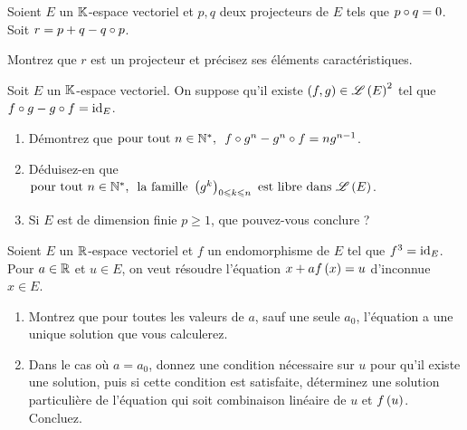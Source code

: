 \begin{corr}
\end{corr}

\begin{exoss}[Exercice 13]
Soient \(E\) un \(\mathbb{K}\)-espace vectoriel et \(p,q\) deux projecteurs de \(E\) tels que \(p\circ q=0\). Soit \(r=p+q-q\circ p\).

Montrez que \(r\) est un projecteur et précisez ses éléments caractéristiques.
\end{exoss}

\begin{corr}
\end{corr}

\begin{exoss}[Exercice 14]
Soit \(E\) un \(\mathbb{K}\)-espace vectoriel. On suppose qu'il existe \(\left(f,g\right)\in\mathscr{L}\left(E\right)^2\) tel que \(f\circ g-g\circ f=\mathrm{id}_{E}\).

\begin{enumerate}
    \item Démontrez que \(\quantifs{\tpt n\in\Ns}f\rond g^n-g^n\rond f=ng^{n-1}\). \\
    \item Déduisez-en que \(\quantifs{\tpt n\in\Ns}\text{la famille }\paren{g^k}_{0\leq k\leq n}\text{ est libre dans }\Lendo{E}\). \\
    \item Si \(E\) est de dimension finie \(p\geq1\), que pouvez-vous conclure ?
\end{enumerate}
\end{exoss}

\begin{corr}
\end{corr}

\begin{exoss}[Exercice 15]
Soient \(E\) un \(\mathbb{R}\)-espace vectoriel et \(f\) un endomorphisme de \(E\) tel que \(f^3=\mathrm{id}_{E}\). Pour \(a\in\mathbb{R}\) et \(u\in E\), on veut résoudre l'équation \(x+af\left(x\right)=u\) d'inconnue \(x\in E\).

\begin{enumerate}
    \item Montrez que pour toutes les valeurs de \(a\), sauf une seule \(a_0\), l'équation a une unique solution que vous calculerez. \\
    \item Dans le cas où \(a=a_0\), donnez une condition nécessaire sur \(u\) pour qu'il existe une solution, puis si cette condition est satisfaite, déterminez une solution particulière de l'équation qui soit combinaison linéaire de \(u\) et \(f\left(u\right)\). Concluez.
\end{enumerate}
\end{exoss}

